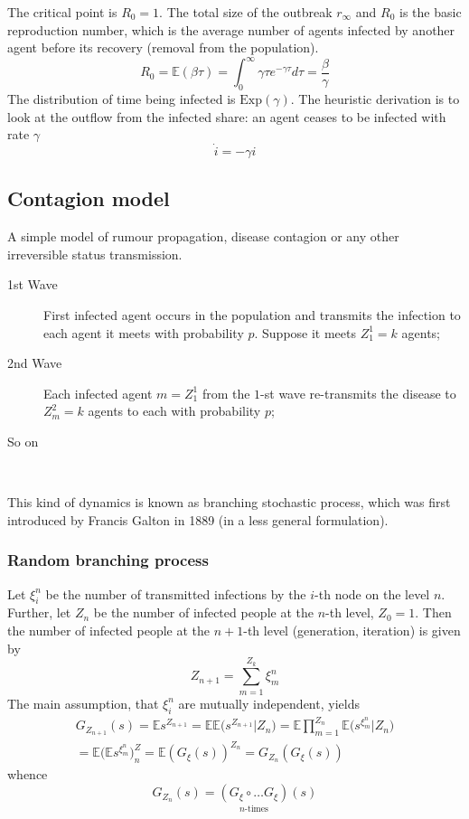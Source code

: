 \documentclass[a4paper]{article}
\newcommand{\Ex}{\mathbb{E}}
\begin{document}
The critical point is $R_0 = 1$. The total size of the outbreak $r_\infty$ and
$R_0$ is the basic reproduction number, which is the average number of agents
infected by another agent before its recovery (removal from the population).
\[
R_0
= \Ex(\beta \tau)
= \int_0^\infty \gamma \tau e^{-\gamma \tau} d\tau
= \frac{\beta}{\gamma}
\]
The distribution of time being infected is $\text{Exp}(\gamma)$. The heuristic
derivation is to look at the outflow from the infected share: an agent ceases to be infected with rate $\gamma$
\[\dot{i} = - \gamma i\]



\subsection{Contagion model} %
\label{sub:contagion_model}

A simple model of rumour propagation, disease contagion or any other
irreversible status transmission. \begin{description}
	\item[1st Wave] First infected agent occurs in the population and
	transmits the infection to each agent it meets with probability $p$.
	Suppose it meets $Z^1_1=k$ agents;
	\item[2nd Wave] Each infected agent $m=Z^1_1$ from the $1$-st wave
	re-transmits the disease to $Z^2_m=k$ agents to each with probability $p$;
	\item[So on] \hfill\\
\end{description}
This kind of dynamics is known as branching stochastic process, which was
first introduced by Francis Galton in 1889 (in a less general formulation).

\subsubsection{Random branching process} %
\label{ssub:random_branching_process}

Let $\xi^n_i$ be the number of transmitted infections by the $i$-th node on
the level $n$. Further, let $Z_n$ be the number of infected people at the
$n$-th level, $Z_0 = 1$. Then the number of infected people at the $n+1$-th
level (generation, iteration) is given by
\[Z_{n+1} = \sum_{m=1}^{Z_k} \xi^n_m\]
The main assumption, that $\xi^n_i$ are mutually independent, yields
\begin{multline*}
G_{Z_{n+1}}(s)
= \Ex s^{Z_{n+1}}
= \Ex \Ex \bigl(s^{Z_{n+1}}\rvert Z_n\bigr)
= \Ex \prod_{m=1}^{Z_n} \Ex \bigl(s^{\xi^n_m}\rvert Z_n\bigr)\\
= \Ex \bigl( \Ex s^{\xi^n_m} \bigl)^Z_n
= \Ex (G_\xi(s))^{Z_n}
= G_{Z_n}( G_\xi(s) )
\end{multline*}
whence
\[G_{Z_n}(s) = \underset{n\text{-times}}{(G_\xi\circ \ldots G_\xi)}(s)\]
\end{document}
